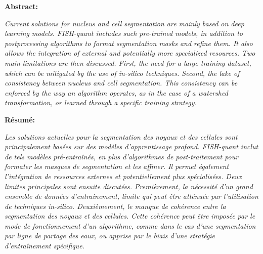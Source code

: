 
\textbf{Abstract:}
\hspace{0.5cm}

\textit{
Current solutions for nucleus and cell segmentation are mainly based on deep learning models.
FISH-quant includes such pre-trained models, in addition to postprocessing algorithms to format segmentation masks and refine them.
It also allows the integration of external and potentially more specialized resources.
Two main limitations are then discussed.
First, the need for a large training dataset, which can be mitigated by the use of in-silico techniques.
Second, the lake of consistency between nucleus and cell segmentation.
This consistency can be enforced by the way an algorithm operates, as in the case of a watershed transformation, or learned through a specific training strategy.
}

\vspace{0.5cm}

\noindent
\textbf{Résumé:}
\hspace{0.5cm}

\textit{
Les solutions actuelles pour la segmentation des noyaux et des cellules sont principalement basées sur des modèles d'apprentissage profond.
FISH-quant inclut de tels modèles pré-entraînés, en plus d'algorithmes de post-traitement pour formater les masques de segmentation et les affiner.
Il permet également l'intégration de ressources externes et potentiellement plus spécialisées.
Deux limites principales sont ensuite discutées.
Premièrement, la nécessité d'un grand ensemble de données d'entraînement, limite qui peut être atténuée par l'utilisation de techniques in-silico.
Deuxièmement, le manque de cohérence entre la segmentation des noyaux et des cellules.
Cette cohérence peut être imposée par le mode de fonctionnement d'un algorithme, comme dans le cas d'une segmentation par ligne de partage des eaux, ou apprise par le biais d'une stratégie d'entraînement spécifique.
}
